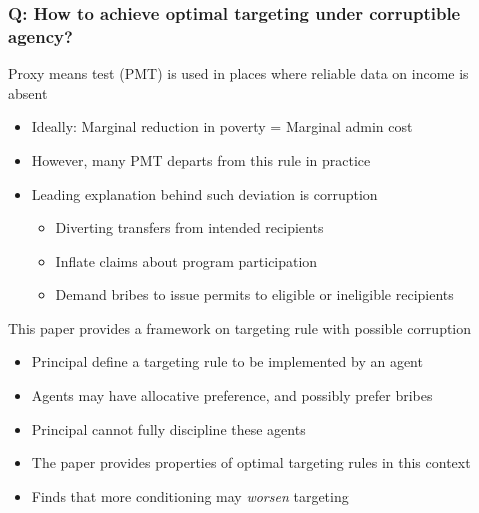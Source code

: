\documentclass[aspectratio=169]{beamer}
\begin{document}
\begin{frame}
\frametitle{Q: How to achieve optimal targeting under corruptible agency?} 
Proxy means test (PMT) is used in places where reliable data on income is absent
\begin{itemize}\setlength\itemsep{3pt}
 \item Ideally: Marginal reduction in poverty = Marginal admin cost
 \item However, many PMT departs from this rule in practice
 \item Leading explanation behind such deviation is corruption
\begin{itemize}\setlength\itemsep{3pt}
\item Diverting transfers from intended recipients
\item Inflate claims about program participation
\item Demand bribes to issue permits to eligible or ineligible recipients
\end{itemize}
\end{itemize}\medskip
This paper provides a framework on targeting rule with possible corruption
\begin{itemize}\setlength\itemsep{3pt}
  \item Principal define a targeting rule to be implemented by an agent
  \item Agents may have allocative preference, and possibly prefer bribes
  \item Principal cannot fully discipline these agents
  \item The paper provides properties of optimal targeting rules in this context
 \item Finds that more conditioning may \textit{worsen} targeting
  \end{itemize}
\end{frame}
\end{document}
